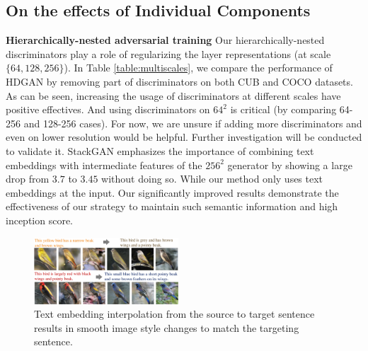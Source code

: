 \documentclass[10pt,twocolumn,letterpaper]{article}
\begin{document}
\subsection{On the effects of Individual Components}
\textbf{Hierarchically-nested adversarial training} Our hierarchically-nested discriminators play a role of regularizing the layer representations (at scale $\{64, 128, 256\}$). 
In Table \ref{table:multiscales}, we compare the performance of HDGAN by removing part of discriminators on both CUB and COCO datasets. 
As can be seen, increasing the usage of discriminators at different scales have positive effectives. And using discriminators on $64^2$ is critical (by comparing 64-256 and 128-256 cases). For now, we are unsure if adding more discriminators and even on lower resolution would be helpful. Further investigation will be conducted to validate it.
StackGAN emphasizes the importance of combining text embeddings with intermediate features of the $256^2$ generator by showing a large drop from $3.7$ to $3.45$ without doing so. While our method only uses text embeddings at the input. Our significantly improved results demonstrate the effectiveness of our strategy to maintain such semantic information and high inception score. 

\begin{figure}[t]
	\centering
	\includegraphics[width=0.48\textwidth]{figure/interp.pdf}
	\vspace{-.5cm}
	\caption{Text embedding interpolation from the source to target sentence results in smooth image style changes to match the targeting sentence. } \label{fig:interp}
	\vspace{-.3cm}
\end{figure}
\end{document}

